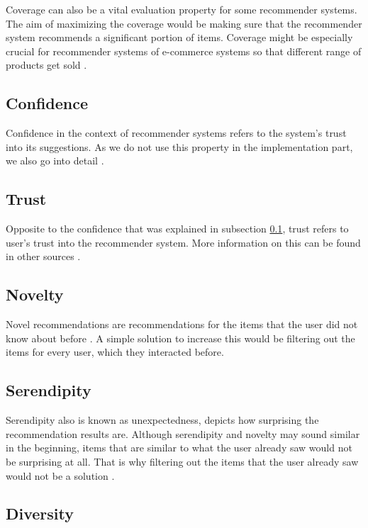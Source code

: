 Coverage can also be a vital evaluation property for some recommender systems. The aim of maximizing the coverage would be making sure that the recommender system recommends a significant portion of items. Coverage might be especially crucial for recommender systems of e-commerce systems so that different range of products get sold \cite{shani2011evaluating}.


\subsection{Confidence}\label{research:confidence}

Confidence in the context of recommender systems refers to the system's trust into its suggestions. As we do not use this property in the implementation part, we also go into detail \cite{herlocker2000explaining}.

\subsection{Trust}

Opposite to the confidence that was explained in subsection \ref{research:confidence}, trust refers to user's trust into the recommender system. More information on this can be found in other sources \cite{shani2011evaluating}.

\subsection{Novelty}

Novel recommendations are recommendations for the items that the user did not know about before \cite{shani2011evaluating}. A simple solution to increase this would be filtering out the items for every user, which they interacted before.

\subsection{Serendipity}

Serendipity also is known as unexpectedness, depicts how surprising the recommendation results are. Although serendipity and novelty may sound similar in the beginning, items that are similar to what the user already saw would not be surprising at all. That is why filtering out the items that the user already saw would not be a solution \cite{shani2011evaluating}.

\subsection{Diversity}

